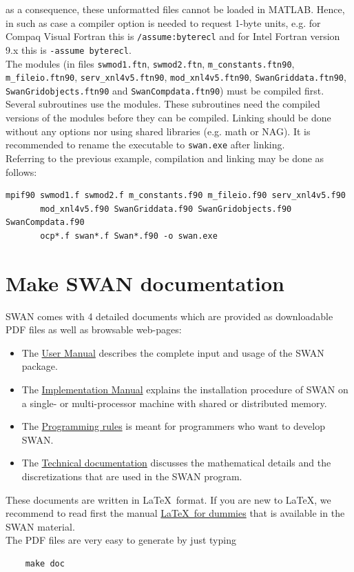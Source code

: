 \documentclass[12pt]{book}
\begin{document}
as a consequence, these unformatted files cannot be loaded in MATLAB. Hence, in such as case a
compiler option is needed to request 1-byte units, e.g. for Compaq Visual Fortran this is
{\tt /assume:byterecl} and for Intel Fortran version 9.x this is {\tt -assume byterecl}.
\\[2ex]
\noindent
The modules (in files {\tt swmod1.ftn}, {\tt swmod2.ftn}, {\tt m\_constants.ftn90},
{\tt m\_fileio.ftn90}, {\tt serv\_xnl4v5.ftn90}, {\tt mod\_xnl4v5.ftn90},
{\tt SwanGriddata.ftn90}, {\tt SwanGridobjects.ftn90} and {\tt SwanCompdata.ftn90}) must be compiled first.
Several subroutines use the modules. These subroutines need the compiled versions of the modules before they can be compiled.
Linking should be done without any options nor using shared libraries (e.g. math or NAG). It is
recommended to rename the executable to {\tt swan.exe} after linking.
\\[2ex]
\noindent
Referring to the previous example, compilation and linking may be done as follows:
\begin{verbatim}
mpif90 swmod1.f swmod2.f m_constants.f90 m_fileio.f90 serv_xnl4v5.f90
       mod_xnl4v5.f90 SwanGriddata.f90 SwanGridobjects.f90 SwanCompdata.f90
       ocp*.f swan*.f Swan*.f90 -o swan.exe
\end{verbatim}

\newpage
\section{Make SWAN documentation} \label{sec:makedoc}

SWAN comes with 4 detailed documents which are provided as downloadable PDF files as well as browsable web-pages:
\begin{itemize}
  \item The \underline{User Manual} describes the complete input and usage of the SWAN package.
  \item The \underline{Implementation Manual} explains the installation procedure of SWAN on a single- or multi-processor machine
        with shared or distributed memory.
  \item The \underline{Programming rules} is meant for programmers who want to develop SWAN.
  \item The \underline{Technical documentation} discusses the mathematical details and the discretizations that are used in the SWAN program.
\end{itemize}
These documents are written in \LaTeX~format. If you are new to \LaTeX, we recommend to read first the manual \underline{\LaTeX~for dummies}
that is available in the SWAN material.
\\[2ex]
\noindent
The PDF files are very easy to generate by just typing
\begin{verbatim}
    make doc
\end{verbatim}
\end{document}
